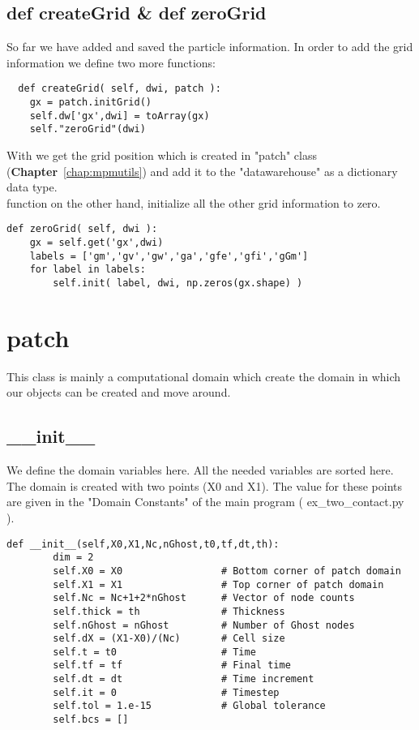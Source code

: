 \documentclass[11pt,fleqn]{book} %
\begin{document}
\section{ def createGrid \& def zeroGrid}
So far we have added and saved the particle information. In order to add the grid information we define two more functions:
\begin{lstlisting}
  def createGrid( self, dwi, patch ):
	gx = patch.initGrid()
	self.dw['gx',dwi] = toArray(gx)
	self."zeroGrid"(dwi)
\end{lstlisting}
With  we get the grid position which is created in "patch" class (\textbf{Chapter}~\ref{chap:mpmutils}) and add it to the "datawarehouse" as a dictionary data type.\\ 
 function on the other hand, initialize all the other grid information to zero. 
\begin{lstlisting}
def zeroGrid( self, dwi ):
	gx = self.get('gx',dwi)
	labels = ['gm','gv','gw','ga','gfe','gfi','gGm']
	for label in labels:
	    self.init( label, dwi, np.zeros(gx.shape) )
\end{lstlisting}


\chapter{patch}
\label{chap:patch}
This class is mainly a computational domain which create the domain in which our objects can be created and move around. 
\section{\_\_init\_\_}
We define the domain variables here. All the needed variables are sorted here.
The domain is created with two points (X0 and X1). The value for these points are given in the "Domain Constants" of the main program ( ex\_two\_contact.py ).
\begin{lstlisting}
def __init__(self,X0,X1,Nc,nGhost,t0,tf,dt,th):
        dim = 2
        self.X0 = X0                 # Bottom corner of patch domain
        self.X1 = X1                 # Top corner of patch domain
        self.Nc = Nc+1+2*nGhost      # Vector of node counts
        self.thick = th              # Thickness
        self.nGhost = nGhost         # Number of Ghost nodes
        self.dX = (X1-X0)/(Nc)       # Cell size
        self.t = t0                  # Time
        self.tf = tf                 # Final time
        self.dt = dt                 # Time increment
        self.it = 0                  # Timestep
        self.tol = 1.e-15            # Global tolerance
        self.bcs = []
\end{lstlisting}  
\end{document}
